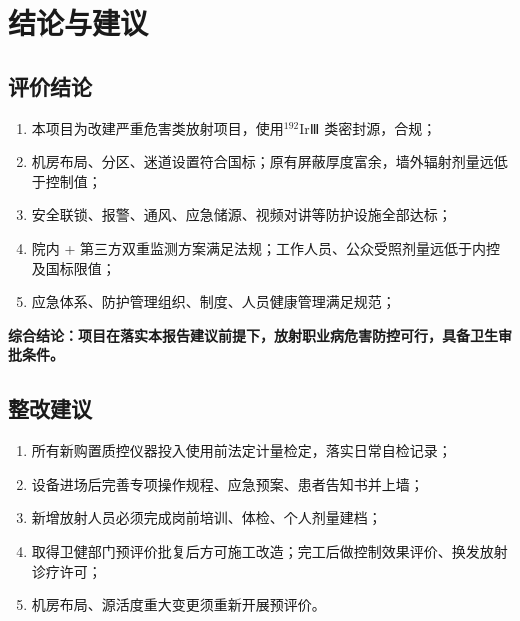 \chapter{结论与建议}

\section{评价结论}

\begin{enumerate}
\item 本项目为改建严重危害类放射项目，使用$^{192}\text{Ir}$Ⅲ 类密封源，合规；
\item 机房布局、分区、迷道设置符合国标；原有屏蔽厚度富余，墙外辐射剂量远低于控制值；
\item 安全联锁、报警、通风、应急储源、视频对讲等防护设施全部达标；
\item 院内 + 第三方双重监测方案满足法规；工作人员、公众受照剂量远低于内控及国标限值；
\item 应急体系、防护管理组织、制度、人员健康管理满足规范；
\end{enumerate}
\textbf{综合结论：项目在落实本报告建议前提下，放射职业病危害防控可行，具备卫生审批条件。}

\section{整改建议}

\begin{enumerate}
\item 所有新购置质控仪器投入使用前法定计量检定，落实日常自检记录；
\item 设备进场后完善专项操作规程、应急预案、患者告知书并上墙；
\item 新增放射人员必须完成岗前培训、体检、个人剂量建档；
\item 取得卫健部门预评价批复后方可施工改造；完工后做控制效果评价、换发放射诊疗许可；
\item 机房布局、源活度重大变更须重新开展预评价。
\end{enumerate}
